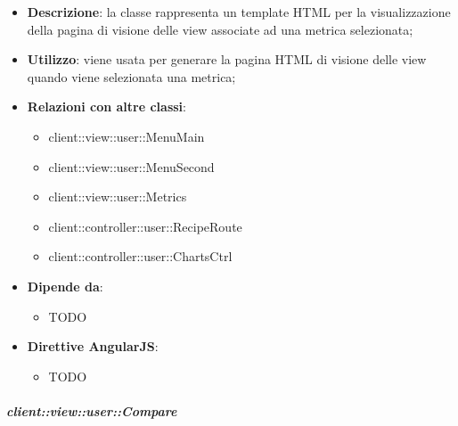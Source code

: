 			\begin{itemize}
				\item \textbf{Descrizione}: la classe rappresenta un template HTML per la visualizzazione della pagina di visione delle view associate ad una metrica selezionata;
				\item \textbf{Utilizzo}: viene usata per generare la pagina HTML di visione delle view quando viene selezionata una metrica;
				\item \textbf{Relazioni con altre classi}:
					\begin{itemize}
						\item client::view::user::MenuMain
						\item client::view::user::MenuSecond
						\item client::view::user::Metrics
						\item client::controller::user::RecipeRoute
						\item client::controller::user::ChartsCtrl
					\end{itemize}
				\item \textbf{Dipende da}:
					\begin{itemize}
						\item TODO
					\end{itemize}
				\item \textbf{Direttive AngularJS}:
					\begin{itemize}
						\item TODO
					\end{itemize}
			\end{itemize}

		\subparagraph{client::view::user::Compare} %
		\label{subp:bdsm_app_client_view_user_compare}

